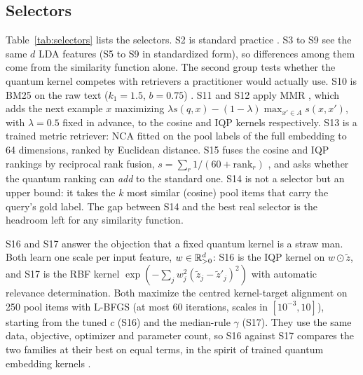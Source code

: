 \subsection{Selectors}
Table~\ref{tab:selectors} lists the selectors. S2 is standard practice \cite{liu2022makes}. S3 to S9
see the same $d$ LDA features (S5 to S9 in standardized form), so differences among them come from the
similarity function alone. The second group tests whether the quantum kernel competes with retrievers a
practitioner would actually use. S10 is BM25 on the raw text ($k_1=1.5$, $b=0.75$)
\cite{robertson2009bm25}. S11 and S12 apply MMR \cite{carbonell1998mmr}, which adds the next example
$x$ maximizing $\lambda s(q,x)-(1-\lambda)\max_{x'\in A}s(x,x')$, with $\lambda=0.5$ fixed in advance, to
the cosine and IQP kernels respectively. S13 is a trained metric retriever: NCA fitted on the pool labels
of the full embedding to 64 dimensions, ranked by Euclidean distance. S15 fuses the cosine and IQP
rankings by reciprocal rank fusion, $s=\sum_r 1/(60+\mathrm{rank}_r)$ \cite{cormack2009rrf}, and asks
whether the quantum ranking can \emph{add} to the standard one. S14 is not a selector but an upper
bound: it takes the $k$ most similar (cosine) pool items that carry the query's gold label. The gap
between S14 and the best real selector is the headroom left for any similarity function.

S16 and S17 answer the objection that a fixed quantum kernel is a straw man. Both learn one scale per
input feature, $w\in\mathbb{R}^d_{>0}$: S16 is the IQP kernel on $w\odot\tilde z$, and S17 is the RBF kernel
$\exp(-\sum_j w_j^2(\tilde z_j-\tilde z'_j)^2)$ with automatic relevance determination. Both maximize the
centred kernel-target alignment \cite{cortes2012centered} on 250 pool items with L-BFGS (at most 60
iterations, scales in $[10^{-3},10]$), starting from the tuned $c$ (S16) and the median-rule $\gamma$
(S17). They use the same data, objective, optimizer and parameter count, so S16 against S17 compares the
two families at their best on equal terms, in the spirit of trained quantum embedding kernels
\cite{hubregtsen2022training}.

